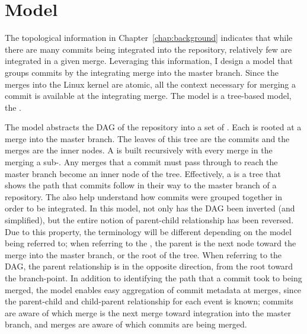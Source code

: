 \chapter{Model}\label{chap:Model}

The topological information in Chapter~\ref{chap:background} indicates
that while there are many commits being integrated into the repository,
relatively few are integrated in a given merge. Leveraging this
information, I design a model that groups commits by the integrating
merge into the master branch. Since the merges into the Linux kernel are
atomic, all the context necessary for merging a commit is available at
the integrating merge. The model is a tree-based model, the \mt{}.

The \mt model abstracts the DAG of the repository into a set of .
Each \mt is rooted at a merge into the master branch. The leaves of this
tree are the commits and the merges are the inner nodes. A \mt is built
recursively with every merge in the \mt merging a sub-\mt. Any merges
that a commit must pass through to reach the master branch become an
inner node of the tree. Effectively, a \mt is a tree that shows the path
that commits follow in their way to the master branch of a repository.
The  also help understand how commits were grouped together in
order to be integrated. In this model, not only has the DAG been
inverted (and simplified), but the entire notion of parent-child
relationship has been reversed. Due to this property, the terminology
will be different depending on the model being referred to; when
referring to the \mt{}, the parent is the next node toward the merge
into the master branch, or the root of the tree. When referring to the
DAG, the parent relationship is in the opposite direction, from the root
toward the branch-point. In addition to identifying the path that a
commit took to being merged, the model enables easy aggregation of
commit metadata at merges, since the parent-child and child-parent
relationship for each event is known; commits are aware of which merge
is the next merge toward integration into the master branch, and merges
are aware of which commits are being merged.

